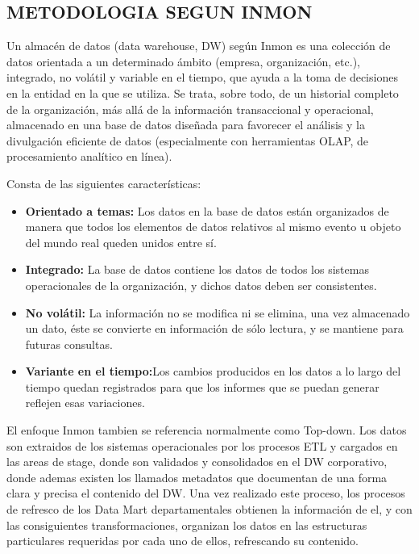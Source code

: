 \documentclass[%
 reprint,
 amsmath,amssymb,
 aps,
]{revtex4-1}
\begin{document}
\subsection{METODOLOGIA SEGUN INMON}	
Un almacén de datos (data warehouse, DW) según Inmon es una colección de datos orientada a un determinado ámbito (empresa, organización, etc.), integrado, no volátil y variable en el tiempo, que ayuda a la toma de decisiones en la entidad en la que se utiliza. Se trata, sobre todo, de un historial completo de la organización, más allá de la información transaccional y operacional, almacenado en una base de datos diseñada para favorecer el análisis y la divulgación eficiente de datos (especialmente con herramientas OLAP, de procesamiento analítico en línea). \cite{estrella2}

Consta de las siguientes características:
\begin{itemize}
		\item \textbf{Orientado a temas:} Los datos en la base de datos están organizados de manera que todos los elementos de datos relativos al mismo evento u objeto del mundo real queden unidos entre sí.
		\item \textbf{Integrado:} La base de datos contiene los datos de todos los sistemas operacionales de la organización, y dichos datos deben ser consistentes. 
		\item \textbf{No volátil:} La información no se modifica ni se elimina, una vez almacenado un dato, éste se convierte en información de sólo lectura, y se 	mantiene para futuras consultas.
		\item \textbf{Variante en el tiempo:}Los cambios producidos en los datos a lo largo del tiempo quedan registrados para que los informes que se puedan generar reflejen esas variaciones.

\end{itemize}


El enfoque Inmon tambien se referencia normalmente como Top-down. Los datos son extraidos de los sistemas operacionales por los procesos ETL y cargados en las areas de stage, donde son validados y consolidados en el DW corporativo, donde ademas existen los llamados metadatos que documentan de una forma clara y precisa el contenido del DW. Una vez realizado este proceso, los procesos de refresco de los Data Mart departamentales obtienen la información de el, y con las consiguientes transformaciones, organizan los datos en las estructuras particulares requeridas por cada uno de ellos, refrescando su contenido.
\end{document}
